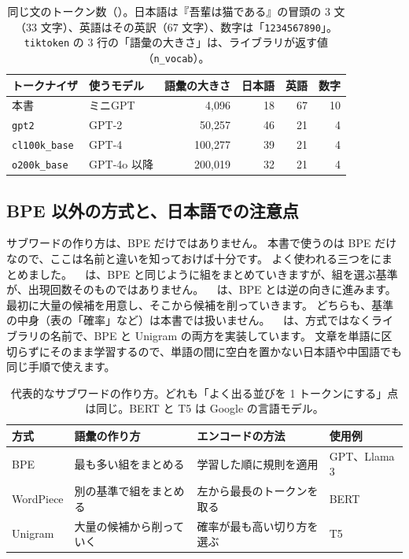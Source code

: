 \begin{table}[tbp]
\centering
\caption{同じ文のトークン数（）。日本語は『吾輩は猫である』の冒頭の 3 文（33 文字）、英語はその英訳（67 文字）、数字は「\texttt{1234567890}」。
\texttt{tiktoken} の 3 行の「語彙の大きさ」は、ライブラリが返す値（\texttt{n\_vocab}）。}
\label{tab:tok-tiktoken}
\small
\begin{tabular}{llrrrr}
\toprule
トークナイザ & 使うモデル & 語彙の大きさ & 日本語 & 英語 & 数字 \\
\midrule
本書 & ミニGPT & 4,096 & 18 & 67 & 10 \\
\texttt{gpt2} & GPT-2 & 50,257 & 46 & 21 & 4 \\
\texttt{cl100k\_base} & GPT-4 & 100,277 & 39 & 21 & 4 \\
\texttt{o200k\_base} & GPT-4o 以降 & 200,019 & 32 & 21 & 4 \\
\bottomrule
\end{tabular}
\end{table}

\subsection*{BPE 以外の方式と、日本語での注意点}

サブワードの作り方は、BPE だけではありません。
本書で使うのは BPE だけなので、ここは名前と違いを知っておけば十分です。
よく使われる三つをにまとめました。
~\cite{schuster2012japanese,wu2016google} は、BPE と同じように組をまとめていきますが、組を選ぶ基準が、出現回数そのものではありません。
~\cite{kudo2018subword} は、BPE とは逆の向きに進みます。最初に大量の候補を用意し、そこから候補を削っていきます。
どちらも、基準の中身（表の「確率」など）は本書では扱いません。
~\cite{kudo2018sentencepiece} は、方式ではなくライブラリの名前で、BPE と Unigram の両方を実装しています。
文章を単語に区切らずにそのまま学習するので、単語の間に空白を置かない日本語や中国語でも同じ手順で使えます。

\begin{table}[tbp]
\centering
\caption{代表的なサブワードの作り方。どれも「よく出る並びを 1 トークンにする」点は同じ。BERT と T5 は Google の言語モデル。}
\label{tab:tok-algos}
\small
\begin{tabularx}{\linewidth}{lXXl}
\toprule
方式 & 語彙の作り方 & エンコードの方法 & 使用例 \\
\midrule
BPE & 最も多い組をまとめる & 学習した順に規則を適用 & GPT、Llama 3 \\
WordPiece & 別の基準で組をまとめる & 左から最長のトークンを取る & BERT \\
Unigram & 大量の候補から削っていく & 確率が最も高い切り方を選ぶ & T5 \\
\bottomrule
\end{tabularx}
\end{table}

